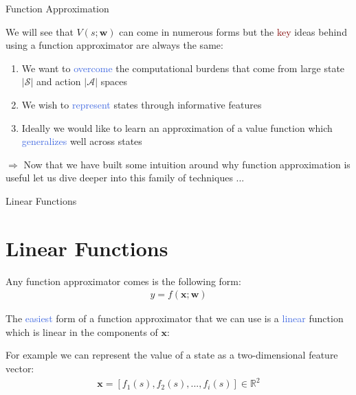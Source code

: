 \documentclass{beamer}
\begin{document}
\begin{frame}{Function Approximation}

	We will see that $V(s;\mathbf{w})$ can come in numerous forms but the \textcolor{Maroon}{key} ideas behind using a function approximator are always the same:
	\begin{enumerate}
		\item We want to \textcolor{RoyalBlue}{overcome} the computational burdens that come from large state $|\mathcal{S}|$ and action $|\mathcal{A}|$ spaces
		\item We wish to \textcolor{RoyalBlue}{represent} states through informative features
		\item Ideally we would like to learn an approximation of a value function which \textcolor{RoyalBlue}{generalizes} well across states
	\end{enumerate}

	\bigskip

	$\Rightarrow$ Now that we have built some intuition around why function approximation is useful let us dive deeper into this family of techniques ...


\end{frame}

\begin{frame}{Linear Functions}
	\section{Linear Functions}

	Any function approximator comes is the following form:
	\begin{align*}
		y = f(\mathbf{x};\mathbf{w})
	\end{align*}


	The \textcolor{RoyalBlue}{easiest} form of a function approximator that we can use is a \textcolor{RoyalBlue}{linear} function 	which is linear in the components of $\mathbf{x}$:

	\bigskip

	For example we can represent the value of a state as a two-dimensional feature vector: 
	\begin{align*}
		\mathbf{x}=[f_1(s), f_2(s), ..., f_i(s)] \in \mathds{R}^2
	\end{align*}

\end{frame}
\end{document}
